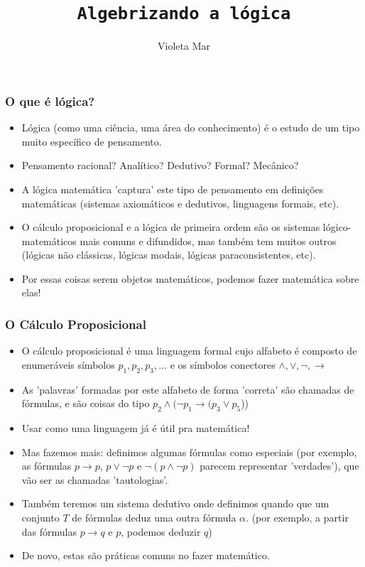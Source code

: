 \newcommand{\slidemode}{1}


\title{\texttt{Algebrizando a lógica}}
\author{Violeta Mar}
\date{}




\begin{frame}{}
\maketitle
\end{frame}

\begin{frame}{}
\frametitle{O que é lógica?}
\pause
\begin{itemize}
    \item Lógica (como uma ciência, uma área do conhecimento) é o estudo de um tipo muito específico de pensamento.\pause
    \item Pensamento racional? Analítico? Dedutivo? Formal? Mecânico? \pause
    \item A lógica matemática 'captura' este tipo de pensamento em definições matemáticas (sistemas axiomáticos e dedutivos, linguagens formais, etc). \pause
    \item O cálculo proposicional e a lógica de primeira ordem são os sistemas lógico-matemáticos mais comuns e difundidos, mas também tem muitos outros (lógicas não clássicas, lógicas modais, lógicas paraconsistentes, etc). \pause
    \item Por essas coisas serem objetos matemáticos, podemos fazer matemática sobre elas!
\end{itemize}
\end{frame}

\begin{frame}{}
\frametitle{O Cálculo Proposicional}
\pause
\begin{itemize}
\item O cálculo proposicional é uma linguagem formal cujo alfabeto é composto de enumeráveis símbolos $p_1,p_2, p_3, \dots$ e os símbolos conectores $\wedge, \vee, \lnot, \rightarrow$ \pause
\item As 'palavras' formadas por este alfabeto de forma 'correta' são chamadas de fórmulas, e são coisas do tipo $p_2 \wedge (\lnot p_1 \rightarrow (p_3 \vee p_5$)) \pause
\item Usar como uma linguagem já é útil pra matemática! \pause
\item Mas fazemos mais: definimos algumas fórmulas como especiais (por exemplo, as fórmulas $p \rightarrow p$, $p \vee \lnot p$ e $\lnot(p \wedge \lnot p)$ parecem representar 'verdades'), que vão ser as chamadas 'tautologias'. \pause
\item Também teremos um sistema dedutivo onde definimos quando que um conjunto $T$ de fórmulas deduz uma outra fórmula $\alpha$. (por exemplo, a partir das fórmulas $p \rightarrow q$ e $p$, podemos deduzir $q$) \pause
\item De novo, estas são práticas comuns no fazer matemático. 
\end{itemize}
\end{frame}

